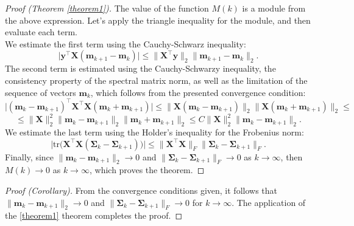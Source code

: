 \documentclass[
11pt,%
tightenlines,%
twoside,%
onecolumn,%
nofloats,%
nobibnotes,%
nofootinbib,%
superscriptaddress,%
noshowpacs,%
centertags]%
{revtex4-2}
\begin{document}
\begin{proof}[Proof (Theorem \ref{theorem1})]
The value of the function $M(k)$ is a module from the above expression. Let's apply the triangle inequality for the module, and then evaluate each term.\\
We estimate the first term using the Cauchy-Schwarz inequality:
\[\big| \mathbf{y}^{\top}\mathbf{X}(\mathbf{m}_{k+1}-\mathbf{m}_k)\big| \leqslant \| \mathbf{X}^{\top}\mathbf{y} \|_2 \|\mathbf{m}_{k+1} - \mathbf{m}_k\|_2. \]
    The second term is estimated using the Cauchy-Schwarzy inequality, the consistency property of the spectral matrix norm, as well as the limitation of the sequence of vectors $\mathbf{m}_k$, which follows from the presented convergence condition:
\[\big| (\mathbf{m}_k - \mathbf{m}_{k+1})^{\top} \mathbf{X}^{\top}\mathbf{X} (\mathbf{m}_k + \mathbf{m}_{k+1}) \big| \leqslant \| \mathbf{X} (\mathbf{m}_k - \mathbf{m}_{k+1}) \|_2 \| \mathbf{X} (\mathbf{m}_k + \mathbf{m}_{k+1}) \|_2 \leqslant \]
    \[ \leqslant \| \mathbf{X} \|_2^2 \| \mathbf{m}_k - \mathbf{m}_{k+1} \|_2 \| \mathbf{m}_k + \mathbf{m}_{k+1} \|_2 \leqslant C \| \mathbf{X} \|_2^2 \| \mathbf{m}_k - \mathbf{m}_{k+1} \|_2. \]
    We estimate the last term using the Holder's inequality for the Frobenius norm:
    \[ \Big| \text{tr} \Big( \mathbf{X}^{\top}\mathbf{X} \left( \mathbf{\Sigma}_k - \mathbf{\Sigma}_{k+1} \right) \Big) \Big| \leqslant \| \mathbf{X}^{\top}\mathbf{X} \|_F \| \mathbf{\Sigma}_k - \mathbf{\Sigma}_{k+1} \|_F. \]
Finally, since $\|\mathbf{m}_k - \mathbf{m}_{k+1} \|_2\to 0$ and $\|\mathbf{\Sigma}_k - \mathbf{\Sigma}_{k+1}\|_{F}\to 0$ as $k\to\infty$, then $M(k)\to 0$ as $k\to \infty$, which proves the theorem.
\end{proof}

\begin{proof}[Proof (Corollary)]
    From the convergence conditions given, it follows that $\|\mathbf{m}_k - \mathbf{m}_{k+1} \|_2\to 0$ and $\|\mathbf{\Sigma}_k -\mathbf{\Sigma}_{k+1}\|_{F}\to 0$ for $k\to \infty$. The application of the \ref{theorem1} theorem completes the proof.
\end{proof}
\end{document}
